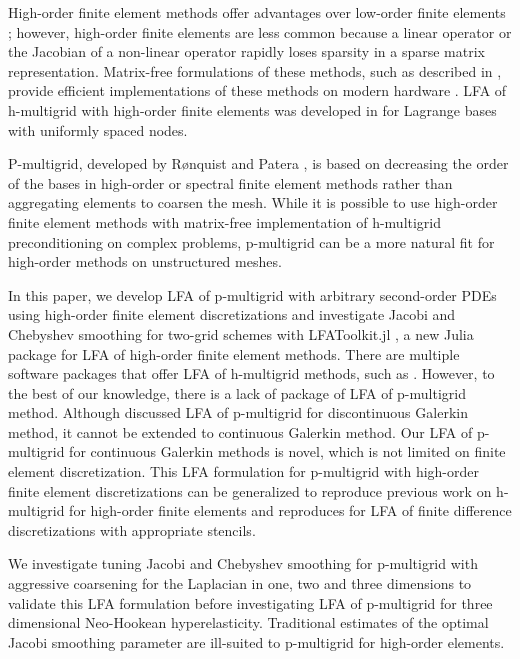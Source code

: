 \documentclass[review]{siamart190516}
\begin{document}
High-order finite element methods offer advantages over low-order finite elements \cite{demkowicz1989toward, oden1989toward, rachowicz1989toward}; however, high-order finite elements are less common because a linear operator or the Jacobian of a non-linear operator rapidly loses sparsity in a sparse matrix representation.
Matrix-free formulations of these methods, such as described in \cite{brown2010efficient, knoll2004jacobian}, provide efficient implementations of these methods on modern hardware \cite{libceed-user-manual, fischer2020scalability}.
LFA of h-multigrid with high-order finite elements was developed in \cite{he2020two} for Lagrange bases with uniformly spaced nodes.

P-multigrid, developed by R{\o}nquist and Patera \cite{ronquist1987spectral}, is based on decreasing the order of the bases in high-order or spectral finite element methods rather than aggregating elements to coarsen the mesh. While it is possible \cite{davydov2019matrix} to use high-order finite element methods with matrix-free implementation of h-multigrid preconditioning on complex problems, p-multigrid can be a more natural fit for high-order methods on unstructured meshes.

In this paper, we develop LFA of p-multigrid with arbitrary second-order PDEs using high-order finite element discretizations and investigate Jacobi and Chebyshev smoothing for two-grid schemes with LFAToolkit.jl \cite{thompson2021toolkit}, a new Julia package for LFA of high-order finite element methods.
There are multiple software packages that offer LFA of h-multigrid methods, such as \cite{kahl2020automated}. However, to the best of our knowledge,  there is a lack of package of LFA of p-multigrid method.  Although \cite{van2011discrete} discussed LFA of p-multigrid for discontinuous Galerkin method, it cannot be extended to continuous Galerkin method. Our LFA of p-multigrid for continuous Galerkin methods is novel, which is not limited on finite element discretization. This LFA formulation for p-multigrid with high-order finite element discretizations can be generalized to reproduce previous work on h-multigrid for high-order finite elements \cite{he2020two} and reproduces for LFA of finite difference discretizations with appropriate stencils.

We investigate tuning Jacobi and Chebyshev smoothing for p-multigrid with aggressive coarsening for the Laplacian in one, two and three dimensions to validate this LFA formulation before investigating LFA of p-multigrid for three dimensional Neo-Hookean hyperelasticity.
Traditional estimates of the optimal Jacobi smoothing parameter are ill-suited to p-multigrid for high-order elements.
\end{document}
